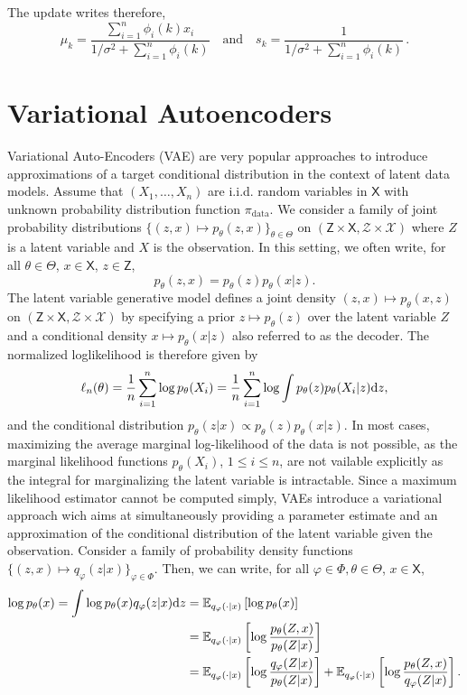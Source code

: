 \documentclass[english,graybox,envcountchap,envcountsame,sectrefs,shortlabels]{svmono}
\theoremstyle{style}
\newcommand{\eqsp}{}
\begin{document}
The update writes therefore,
$$
\mu_k = \frac{\sum_{i=1}^n \phi_i(k)x_i}{1/\sigma^2 + \sum_{i=1}^n \phi_i(k)}\quad\mathrm{and}\quad s_k = \frac{1}{1/\sigma^2 + \sum_{i=1}^n \phi_i(k)}\,. 
$$

\section*{Variational Autoencoders}
Variational Auto-Encoders (VAE) are very popular approaches to introduce approximations of a target conditional distribution in the context of latent data models. Assume that $(X_1,\ldots,X_n)$ are i.i.d. random variables in $\mathsf{X}$ with unknown probability distribution function $\pi_{\mathrm{data}}$. We consider a family of joint probability distributions $\{(z,x) \mapsto  p_{\theta}(z,x)\}_{\theta\in\Theta}$ on $(\mathsf{Z}\times \mathsf{X}, \mathcal{Z}\times \mathcal{X})$ where $Z$ is a latent variable and $X$ is the observation. In this setting, we often write, for all $\theta\in\Theta$, $x\in\mathsf{X}$, $z\in\mathsf{Z}$,
$$
p_{\theta}(z,x) = p_{\theta}(z)p_{\theta}(x|z)\eqsp.
$$
The latent variable generative model defines a joint density $(z,x)\mapsto p_\theta(x, z)$  on $(\mathsf{Z}\times \mathsf{X}, \mathcal{Z}\times \mathcal{X})$  by specifying a prior $z\mapsto p_{\theta}(z)$ over the latent variable $Z$ and a conditional density $x\mapsto p_\theta(x|z)$ also referred to as the decoder.  The normalized loglikelihood is therefore given by
$$
\ell_n(\theta) = \frac{1}{n}\sum_{i=1}^n \log p_{\theta}(X_i) = \frac{1}{n}\sum_{i=1}^n \log \int p_{\theta}(z)p_{\theta}(X_i|z)\rmd z\eqsp,
$$
and the conditional distribution $p_{\theta}(z|x)\propto p_{\theta}(z)p_{\theta}(x|z)$. In most cases, maximizing the average
marginal log-likelihood of the data is not possible, as the marginal likelihood functions $p_{\theta}(X_i)$, $1\leqslant i \leqslant n$, are not vailable explicitly as the integral for marginalizing the latent variable is intractable.  Since a maximum likelihood estimator cannot be computed simply, VAEs introduce a variational approach wich aims at simultaneously providing a parameter estimate  and an approximation of the conditional distribution of the latent variable given the observation.  Consider a family of probability density functions $\{(z,x) \mapsto q_{\varphi}(z|x)\}_{\varphi\in\Phi}$. Then, we can write, for all $\varphi\in\Phi,\theta\in\Theta$, $x\in\mathsf{X}$,
\begin{align*}
\log p_\theta(x) = \int \log p_\theta(x) q_{\varphi}(z|x) \mathrm{d} z &= \mathbb{E}_{q_{\varphi}(\cdot|x)}\left[\log p_\theta(x)\right] \\
&= \mathbb{E}_{q_{\varphi}(\cdot|x)}\left[\log \frac{p_\theta(Z,x)}{p_\theta(Z|x)}\right] \\
&= \mathbb{E}_{q_{\varphi}(\cdot|x)}\left[\log \frac{q_{\varphi}(Z|x)}{p_\theta(Z|x)}\right]  + \mathbb{E}_{q_{\varphi}(\cdot|x)}\left[\log \frac{p_\theta(Z,x)}{q_{\varphi}(Z|x)}\right] .
\end{align*}
\end{document}
